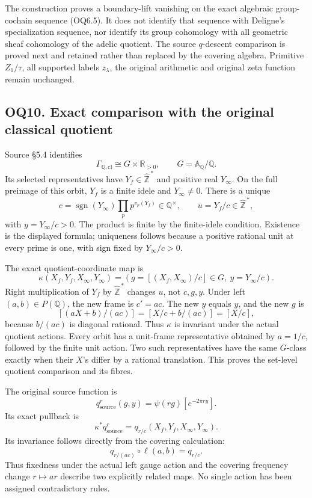 The construction proves a boundary-lift vanishing on the exact algebraic
group-cochain sequence (OQ6.5). It does not identify that sequence with
Deligne's specialization sequence, nor identify its group cohomology
with all geometric sheaf cohomology of the adelic quotient. The source
\(q\)-descent comparison is proved next and retained rather than
replaced by the covering algebra. Primitive \(Z_1/\tau\), all supported
labels \(z_\lambda\), the original arithmetic and original zeta function
remain unchanged.

\subsection{OQ10. Exact comparison with the original classical
quotient}\label{oq10.-exact-comparison-with-the-original-classical-quotient}

Source §5.4 identifies \[
\Gamma_{\mathbb Q,\mathrm{cl}}
\cong G\times\mathbb R_{>0},\qquad
G=\mathbb A_{\mathbb Q}/\mathbb Q.
\tag{OQ10.1}
\] Its selected representatives have \(Y_f\in\widehat{\mathbb Z}^{\,*}\)
and positive real \(Y_\infty\). On the full preimage of this orbit,
\(Y_f\) is a finite idele and \(Y_\infty\ne0\). There is a unique \[
c=\operatorname{sgn}(Y_\infty)
\prod_p p^{v_p(Y_f)}\in\mathbb Q^\times,\qquad
u=Y_f/c\in\widehat{\mathbb Z}^{\,*},
\tag{OQ10.2}
\] with \(y=Y_\infty/c>0\). The product is finite by the finite-idele
condition. Existence is the displayed formula; uniqueness follows
because a positive rational unit at every prime is one, with sign fixed
by \(Y_\infty/c>0\).

The exact quotient-coordinate map is \[
\kappa(X_f,Y_f,X_\infty,Y_\infty)
=\left(g=[(X_f,X_\infty)/c]\in G,\
y=Y_\infty/c\right).
\tag{OQ10.3}
\] Right multiplication of \(Y_f\) by \(\widehat{\mathbb Z}^{\,*}\)
changes \(u\), not \(c,g,y\). Under left \((a,b)\in P(\mathbb Q)\), the
new frame is \(c'=ac\). The new \(y\) equals \(y\), and the new \(g\) is
\[
[(aX+b)/(ac)]=[X/c+b/(ac)]=[X/c],
\tag{OQ10.4}
\] because \(b/(ac)\) is diagonal rational. Thus \(\kappa\) is invariant
under the actual quotient actions. Every orbit has a unit-frame
representative obtained by \(a=1/c\), followed by the finite unit
action. Two such representatives have the same \(G\)-class exactly when
their \(X\)'s differ by a rational translation. This proves the
set-level quotient comparison and its fibres.

The original source function is \[
q^r_{\mathrm{source}}(g,y)=\psi(rg)[e^{-2\pi ry}].
\] Its exact pullback is \[
\boxed{\kappa^*q^r_{\mathrm{source}}
=q_{r/c}(X_f,Y_f,X_\infty,Y_\infty).}
\tag{OQ10.5}
\] Its invariance follows directly from the covering calculation: \[
q_{r/(ac)}\circ\ell(a,b)=q_{r/c}.
\tag{OQ10.6}
\] Thus fixedness under the actual left gauge action and the covering
frequency change \(r\mapsto ar\) describe two explicitly related maps.
No single action has been assigned contradictory rules.

